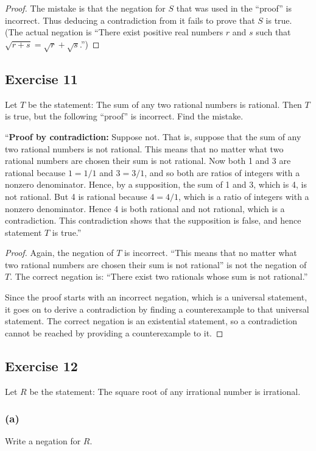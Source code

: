 \documentclass[14pt]{extarticle}
\begin{document}
\begin{proof}
    The mistake is that the negation for $S$ that was used in the “proof” is incorrect. Thus deducing a contradiction from it fails to prove that $S$ is true. (The actual negation is “There exist positive real numbers $r$ and $s$ such that $\sqrt{r + s} = \sqrt{r} + \sqrt{s}$.”)
\end{proof}

\subsection{Exercise 11}
Let $T$ be the statement: The sum of any two rational numbers is rational. Then $T$ is true, but the following “proof” is incorrect. Find the mistake.

“{\bf Proof by contradiction:} Suppose not. That is, suppose that the sum of any two rational numbers is not rational. This means that no matter what two rational numbers are chosen their sum is not rational. Now both 1 and 3 are rational because $1 = 1/1$ and $3 = 3/1$, and so both are ratios of integers with a nonzero denominator. Hence, by a supposition, the sum of 1 and 3, which is 4, is not rational. But 4 is rational because $4 = 4/1$, which is a ratio of integers with a nonzero denominator. Hence 4 is both rational and not rational, which is a contradiction. This contradiction shows that the supposition is false, and hence statement $T$ is true.”

\begin{proof}
    Again, the negation of $T$ is incorrect. ``This means that no matter what two rational numbers are chosen their sum is not rational'' is not the negation of $T$. The correct negation is: ``There exist two rationals whose sum is not rational.''

    Since the proof starts with an incorrect negation, which is a universal statement, it goes on to derive a contradiction by finding a counterexample to that universal statement. The correct negation is an existential statement, so a contradiction cannot be reached by providing a counterexample to it.
\end{proof}

\subsection{Exercise 12}
Let $R$ be the statement: The square root of any irrational number is irrational.

\subsubsection{(a)}
Write a negation for $R$.
\end{document}
